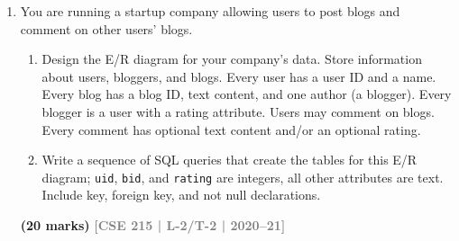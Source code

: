 \documentclass[12pt,a3paper]{article}
\newcommand{\yr}[1]{\hfill\textcolor{gray}{\small\textbf{[#1]}}}
\newcommand{\mk}[1]{\textcolor{orange!70!black}{\small\textbf{(#1 marks)}}}
\begin{document}
\begin{enumerate}
\begin{center}
\begin{tikzpicture}
    \end{tikzpicture}
\end{center}

\begin{enumerate}
  \item Enroll is a strong entity set.
  \item All teachers must teach courses.
  \item All students must enroll in courses.
  \item All courses must be enrolled by students.
  \item All courses must be taught by teachers.
  \item Each course is taught by only one teacher.
  \item Each course is enrolled by only one student.
  \item Each teacher may teach many courses.
  \item Each student can enroll in many courses.
  \item Teacher is a relationship set.
\end{enumerate}
\mk{10} \yr{CSE 215 | L-2/T-2 | 2020--21}

\item You are running a startup company allowing users to post blogs and comment on other users' blogs.
\begin{enumerate}
  \item Design the E/R diagram for your company's data. Store information about users, bloggers, and blogs. Every user has a user ID and a name. Every blog has a blog ID, text content, and one author (a blogger). Every blogger is a user with a rating attribute. Users may comment on blogs. Every comment has optional text content and/or an optional rating.
  \item Write a sequence of SQL queries that create the tables for this E/R diagram; \texttt{uid}, \texttt{bid}, and \texttt{rating} are integers, all other attributes are text. Include key, foreign key, and not null declarations.
\end{enumerate}
\mk{20} \yr{CSE 215 | L-2/T-2 | 2020--21}


\end{enumerate}
\end{document}
